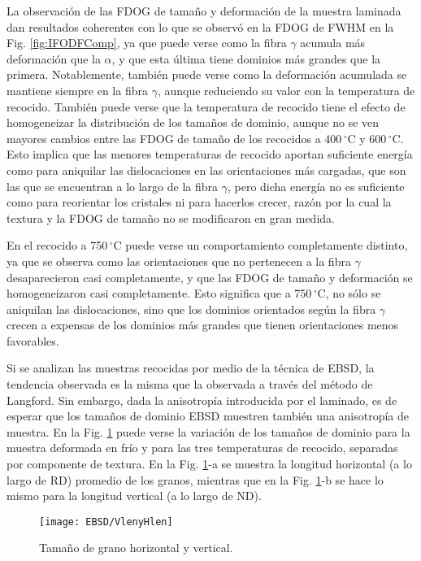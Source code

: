 La observación de las FDOG de tamaño y deformación de la muestra laminada dan resultados coherentes con lo que se observó en la FDOG de FWHM en la Fig. \ref{fig:IFODFComp}, ya que puede verse como la fibra $\gamma$ acumula más deformación que la $\alpha$, y que esta última tiene dominios más grandes que la primera.
Notablemente, también puede verse como la deformación acumulada se mantiene siempre en la fibra $\gamma$, aunque reduciendo su valor con la temperatura de recocido.
También puede verse que la temperatura de recocido tiene el efecto de homogeneizar la distribución de los tamaños de dominio, aunque no se ven mayores cambios entre las FDOG de tamaño de los recocidos a 400\,$^{\circ}$C y 600\,$^{\circ}$C.
Esto implica que las menores temperaturas de recocido aportan suficiente energía como para aniquilar las dislocaciones en las orientaciones más cargadas, que son las que se encuentran a lo largo de la fibra $\gamma$, pero dicha energía no es suficiente como para reorientar los cristales ni para hacerlos crecer, razón por la cual la textura y la FDOG de tamaño no se modificaron en gran medida.

En el recocido a 750\,$^{\circ}$C puede verse un comportamiento completamente distinto, ya que se observa como las orientaciones que no pertenecen a la fibra $\gamma$ desaparecieron casi completamente, y que las FDOG de tamaño y deformación se homogeneizaron casi completamente.
Esto significa que a 750\,$^{\circ}$C, no sólo se aniquilan las dislocaciones, sino que los dominios orientados según la fibra $\gamma$ crecen a expensas de los dominios más grandes que tienen orientaciones menos favorables.

Si se analizan las muestras recocidas por medio de la técnica de EBSD, la tendencia observada es la misma que la observada a través del método de Langford.
Sin embargo, dada la anisotropía introducida por el laminado, es de esperar que los tamaños de dominio EBSD muestren también una anisotropía de muestra.
En la Fig. \ref{fig:VlyHl} puede verse la variación de los tamaños de dominio para la muestra deformada en frío y para las tres temperaturas de recocido, separadas por componente de textura.
En la Fig. \ref{fig:VlyHl}-a se muestra la longitud horizontal (a lo largo de RD) promedio de los granos, mientras que en la Fig. \ref{fig:VlyHl}-b se hace lo mismo para la longitud vertical (a lo largo de ND).

\begin{figure}[!htb]
  \centering
  \texttt{[image: EBSD/VlenyHlen]}
  \caption{Tamaño de grano horizontal y vertical.}
  \label{fig:VlyHl}
\end{figure}

